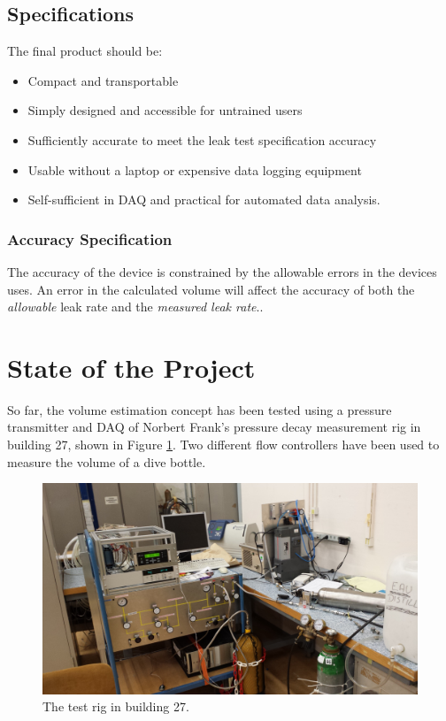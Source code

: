 \documentclass{report}
\begin{document}
\subsection{Specifications}
The final product should be:

\begin{itemize}
	\item{Compact and transportable}
	\item{Simply designed and accessible for untrained users}
	\item{Sufficiently accurate to meet the leak test specification accuracy}
	\item{Usable without a laptop or expensive data logging equipment}
	\item{Self-sufficient in DAQ and practical for automated data analysis.}
\end{itemize}

\subsubsection{Accuracy Specification}
The accuracy of the device is constrained by the allowable errors in the devices uses. An error in the calculated volume will affect the accuracy of both the \textit{allowable} leak rate and the \textit{measured leak rate}.\cite{leakPaola}.
	
\section{State of the Project}
So far, the volume estimation concept has been tested using a pressure transmitter and DAQ of Norbert Frank's pressure decay measurement rig in building 27, shown in Figure \ref{b27}. Two different flow controllers have been used to measure the volume of a dive bottle. 
\begin{figure}[h]
\includegraphics[width = \textwidth]{wide}
\caption{The test rig in building 27.}
\label{b27}
\end{figure}
\end{document}
